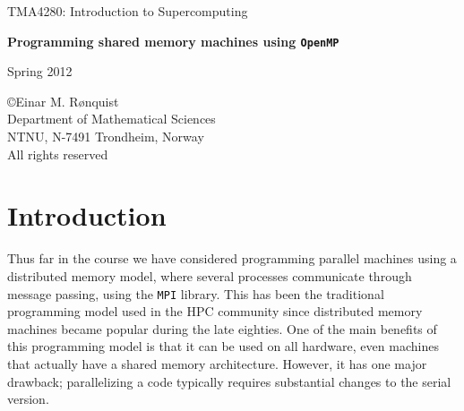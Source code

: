 \documentclass[twoside, 11pt, a4paper]{article}
\begin{document}
\LARGE
\begin{center}
TMA4280: Introduction to Supercomputing
\end{center}
\vspace{1in}

\begin{center}
{\bf Programming shared memory machines using \texttt{OpenMP}}
\end{center}

\Large
\vspace{0.5in}
\begin{center}
Spring 2012
\end{center}

\vspace{0.5in}

\begin{center}
\copyright Einar M. R{\o}nquist \\
Department of Mathematical Sciences\\
NTNU, N-7491 Trondheim, Norway\\
All rights reserved
\end{center}

\large

\newpage

\section{Introduction}
Thus far in the course we have considered programming parallel machines using a distributed
memory model, where several processes communicate through message passing, using
the \texttt{MPI} library. This has been the traditional programming
model used in the HPC community since distributed memory machines became popular
during the late eighties. One of the main benefits of this programming model
is that it can be used on all hardware, even machines that actually have a shared memory
architecture. However, it has one major drawback; parallelizing a code typically requires
substantial changes to the serial version.
\end{document}
